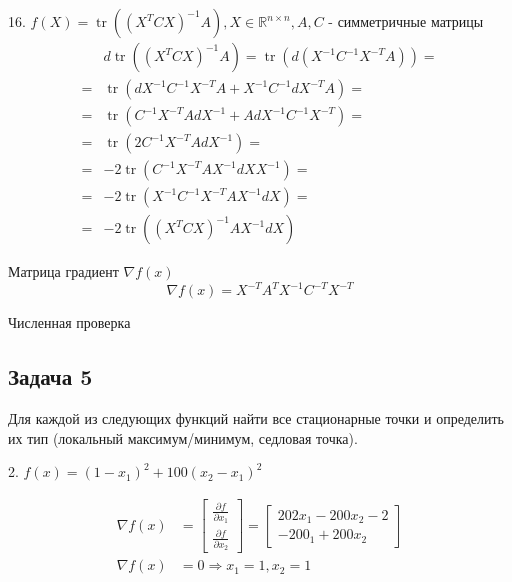 \documentclass{article}
\DeclareMathOperator{\tr}{tr}
\newcommand{\RM}[2] {\mathbb{R}^{#1 \times #2}}
\begin{document}
    16. $f(X) = \tr((X^TCX)^{-1}A), X \in \RM{n}{n}, A, C$ - симметричные матрицы
    \begin{align*}
        &d\tr((X^TCX)^{-1}A) = \tr(d(X^{-1}C^{-1}X^{-T}A)) =\\ 
        = &\tr(dX^{-1}C^{-1}X^{-T}A + X^{-1}C^{-1}dX^{-T}A) =\\
        = &\tr(C^{-1}X^{-T}AdX^{-1} + AdX^{-1}C^{-1}X^{-T}) =\\ 
        = &\tr(2C^{-1}X^{-T}AdX^{-1}) =\\
        = &-2\tr(C^{-1}X^{-T}AX^{-1}dXX^{-1}) =\\
        = &-2\tr(X^{-1}C^{-1}X^{-T}AX^{-1}dX) =\\
        = &-2\tr((X^TCX)^{-1}AX^{-1}dX)
    \end{align*}
    
    Матрица градиент $\nabla f(x)$
    \begin{equation*}
         \nabla f(x) = X^{-T}A^TX^{-1}C^{-T}X^{-T}
    \end{equation*}
    
    Численная проверка
    
    \newpage
    
    \subsection*{Задача 5}
    Для каждой из следующих функций найти все стационарные точки и определить их
 тип (локальный максимум/минимум, седловая точка).
    \bigbreak
    
    2. $f(x) = (1- x_1)^2 + 100(x_2 - x_1)^2$
    
    \begin{align*}
        \nabla f(x) &= 
                \left[
                \begin{matrix} 
                    \frac{\partial f}{\partial x_1}\\
                    \frac{\partial f}{\partial x_2}
                \end{matrix}
                \right] 
                = 
                \left[
                \begin{matrix} 
                    202x_1 - 200x_2 - 2\\
                    -200_1 + 200x_2
                \end{matrix}
                \right]\\
        \nabla f(x) &= 0 \Rightarrow x_1 = 1, x_2 = 1
    \end{align*}
    
\end{document}
